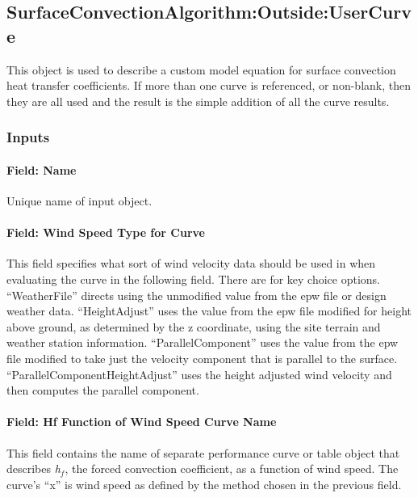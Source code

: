 \subsection{SurfaceConvectionAlgorithm:Outside:UserCurve}\label{surfaceconvectionalgorithmoutsideusercurve}

This object is used to describe a custom model equation for surface convection heat transfer coefficients. If more than one curve is referenced, or non-blank, then they are all used and the result is the simple addition of all the curve results.

\subsubsection{Inputs}\label{inputs-9}

\paragraph{Field: Name}\label{field-name-8}

Unique name of input object.

\paragraph{Field: Wind Speed Type for Curve}\label{field-wind-speed-type-for-curve}

This field specifies what sort of wind velocity data should be used in when evaluating the curve in the following field. There are for key choice options. ``WeatherFile'' directs using the unmodified value from the epw file or design weather data. ``HeightAdjust'' uses the value from the epw file modified for height above ground, as determined by the z coordinate, using the site terrain and weather station information. ``ParallelComponent'' uses the value from the epw file modified to take just the velocity component that is parallel to the surface. ``ParallelComponentHeightAdjust'' uses the height adjusted wind velocity and then computes the parallel component.

\paragraph{Field: Hf Function of Wind Speed Curve Name}\label{field-hf-function-of-wind-speed-curve-name}

This field contains the name of separate performance curve or table object that describes \emph{h\(_{f}\)}, the forced convection coefficient, as a function of wind speed. The curve's ``x'' is wind speed as defined by the method chosen in the previous field.

